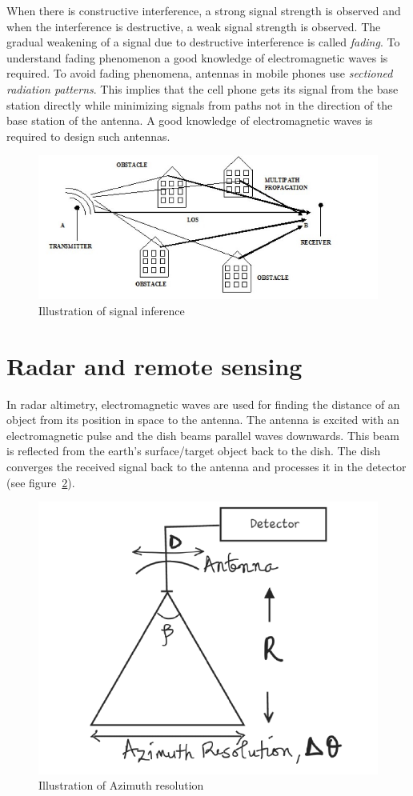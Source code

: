 When there is constructive interference, a strong signal strength is observed and when the interference is destructive, a weak signal strength is observed. The gradual weakening of a signal due to destructive interference is called \textit{fading}. To understand fading phenomenon a good knowledge of electromagnetic waves is required. To avoid fading phenomena, antennas in mobile phones use \textit{sectioned radiation patterns}. This implies that the cell phone gets its signal from the base station directly while minimizing signals from paths not in the direction of the base station of the antenna. A good knowledge of electromagnetic waves is required to design such antennas.
\begin{figure}[h]
\centering
\includegraphics[scale=0.4]{./graphics/rod}
\caption{Illustration of signal inference}
\label{fig:rod}
\end{figure}

\section{Radar and remote sensing}
In radar altimetry, electromagnetic waves are used for finding the distance of an object from its position in space to the antenna. The antenna is excited with an electromagnetic pulse and the dish beams parallel waves downwards. This beam is reflected from the earth's surface/target object back to the dish. The dish converges the received signal back to the antenna and processes it in the detector (see figure~\ref{fig:new}).
\begin{figure}[h]
\centering
\includegraphics[width=.8\linewidth]{./graphics/New}
\caption{Illustration of Azimuth resolution}
\label{fig:new}
\end{figure}

